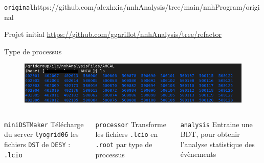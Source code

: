 \documentclass[9pt]{beamer}
\begin{document}
\begin{frame}{\texttt{original}}{https://github.com/alexhxia/nnhAnalysis/tree/main/nnhProgram/original}

\begin{block}{Projet initial}
	\url{https://github.com/ggarillot/nnhAnalysis/tree/refactor}
\end{block}

\begin{block}{Type de processus}
	\begin{figure}
		\center
		\includegraphics[width=\textwidth]{../img/listeProcessus.png} 
	\end{figure}
\end{block}

\begin{columns}

	\begin{column}{0.33\textwidth}
		\begin{block}{\texttt{miniDSTMaker}}
			Télécharge du server \texttt{lyogrid06} les fichiers \texttt{DST} de \texttt{DESY} : \texttt{.lcio}
		\end{block}
	\end{column}
	
	\begin{column}{0.33\textwidth}
		\begin{block}{\texttt{processor}}
			Transforme les fichiers \texttt{.lcio} en \texttt{.root} par type de processus
		\end{block}
	\end{column}
	
	\begin{column}{0.33\textwidth}
		\begin{block}{\texttt{analysis}}
			Entraine une BDT, pour obtenir l'analyse statistique des évènements
		\end{block}
	\end{column}

\end{columns}

\end{frame}

\end{document}
